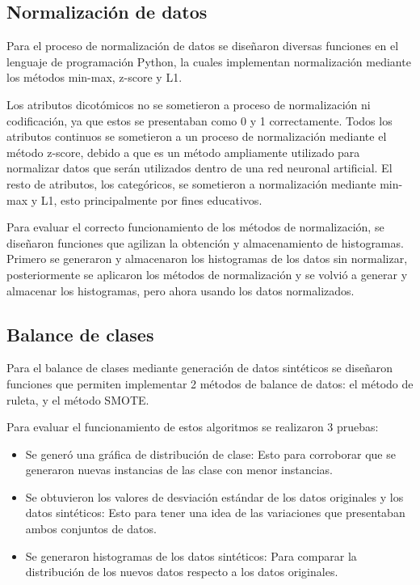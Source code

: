 \subsection{Normalización de datos}
Para el proceso de normalización de datos se diseñaron diversas funciones en el lenguaje de programación Python, la cuales implementan normalización mediante los métodos min-max, z-score y L1.

Los atributos dicotómicos no se sometieron a proceso de normalización ni codificación, ya que estos se presentaban como 0 y 1 correctamente. Todos los atributos continuos se sometieron a un proceso de normalización mediante el método z-score, debido a que es un método ampliamente utilizado  para normalizar datos que serán utilizados dentro de una red neuronal artificial. El resto de atributos, los categóricos, se sometieron a normalización mediante min-max y L1, esto principalmente por fines educativos.

Para evaluar el correcto funcionamiento de los métodos de normalización, se diseñaron funciones que agilizan la obtención y almacenamiento de histogramas. Primero se generaron y almacenaron los histogramas de los datos sin normalizar, posteriormente se aplicaron los métodos de normalización y se volvió a generar y almacenar los histogramas, pero ahora usando los datos normalizados.

\subsection{Balance de clases}
Para el balance de clases mediante generación de datos sintéticos se diseñaron funciones que permiten implementar 2 métodos de balance de datos: el método de ruleta, y el método SMOTE.

Para evaluar el funcionamiento de estos algoritmos se realizaron 3 pruebas:

\begin{itemize}
	\item Se generó una gráfica de distribución de clase: Esto para corroborar que se generaron nuevas instancias de las clase con menor instancias.
	\item Se obtuvieron los valores de desviación estándar de los datos originales y los datos sintéticos: Esto para tener una idea de las variaciones que presentaban ambos conjuntos de datos.
	\item Se generaron histogramas de los datos sintéticos: Para comparar la distribución de los nuevos datos respecto a los datos originales.
\end{itemize}
